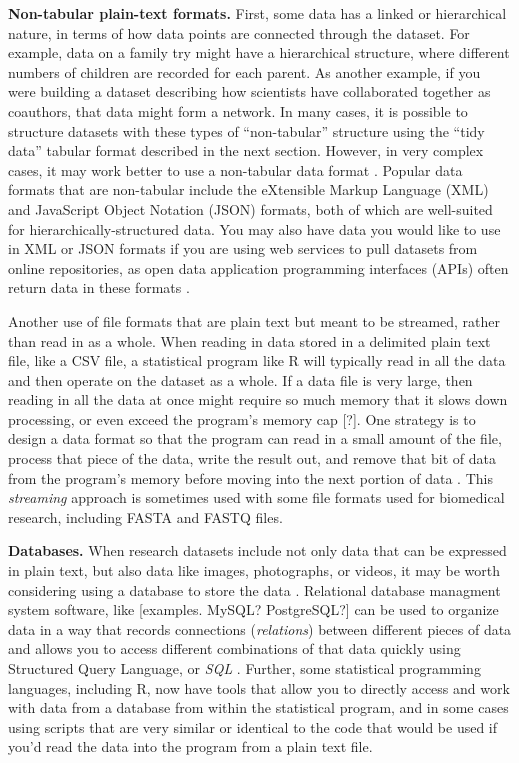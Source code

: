 \documentclass[]{tufte-book}
\begin{document}
\textbf{Non-tabular plain-text formats.}
First, some data has a linked or hierarchical nature, in terms of how data
points are connected through the dataset. For example, data on a family try
might have a hierarchical structure, where different numbers of children are
recorded for each parent. As another example, if you were building a dataset
describing how scientists have collaborated together as coauthors, that data
might form a network. In many cases, it is possible to structure datasets with
these types of ``non-tabular'' structure using the ``tidy data'' tabular format
described in the next section. However, in very complex cases, it may work
better to use a non-tabular data format \citep{raymond2003art}. Popular data formats
that are non-tabular include the eXtensible Markup Language (XML) and JavaScript
Object Notation (JSON) formats, both of which are well-suited for
hierarchically-structured data. You may also have data you would like to use in
XML or JSON formats if you are using web services to pull datasets from online
repositories, as open data application programming interfaces (APIs) often
return data in these formats \citep{janssens2014data}.

Another use of file formats that are plain text but meant to be streamed, rather
than read in as a whole. When reading in data stored in a delimited plain text
file, like a CSV file, a statistical program like R will typically read in all
the data and then operate on the dataset as a whole. If a data file is very
large, then reading in all the data at once might require so much memory that it
slows down processing, or even exceed the program's memory cap {[}?{]}. One strategy
is to design a data format so that the program can read in a small amount of the
file, process that piece of the data, write the result out, and remove that bit
of data from the program's memory before moving into the next portion of data
\citep{buffalo2015bioinformatics}. This \emph{streaming} approach is sometimes used with
some file formats used for biomedical research, including FASTA and FASTQ files.

\textbf{Databases.}
When research datasets include not only data that can be expressed in plain
text, but also data like images, photographs, or videos, it may be worth
considering using a database to store the data \citep{murrell2009introduction}.
Relational database managment system software, like {[}examples. MySQL?
PostgreSQL?{]} can be used to organize data in a way that records connections
(\emph{relations}) between different pieces of data and allows you to access
different combinations of that data quickly using Structured Query Language, or
\emph{SQL} \citep{ford2015i}. Further, some statistical programming languages, including
R, now have tools that allow you to directly access and work with data from a
database from within the statistical program, and in some cases using scripts
that are very similar or identical to the code that would be used if you'd read
the data into the program from a plain text file.
\end{document}
